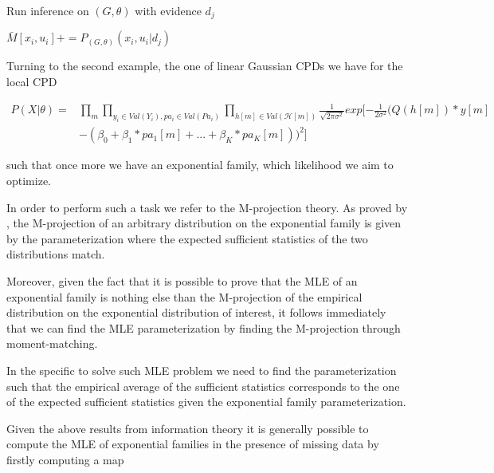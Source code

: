 \documentclass[11pt]{article}
\begin{document}
\begin{article}
\begin{algorithm*}[h!]
\begin{multicols}{2}
\begin{algorithmic}[1]
    \State Run inference on $(G,\theta)$ with evidence $d_{j}$

        \State $\bar{M}[x_{i},u_{i}] \mathrel{{+}{=}} P_{(G,\theta)}(x_{i},u_{i}|d_{j})$
      \EndFor
    \EndFor
\EndFor
\EndFunction
\end{algorithmic}
\end{multicols}
\end{algorithm*}


Turning to the second example, the one of linear Gaussian CPDs we
have for the local CPD

\begin{align} \label{eq:like-gaussian-cpd}
P(X|\theta) = &\prod_m \prod_{y_i \in Val(Y_i), pa_i \in Val(Pa_i)} \prod_{h[m] \in Val(\mathscr{H}[m])} \frac{1}{\sqrt{2\pi\sigma^2}} exp[-\frac{1}{2\sigma^2} (Q(h[m]) * y[m]  \\
	    & - (\beta_0 + \beta_1 * pa_1[m] + ... + \beta_K * pa_K[m]))^2]  \nonumber
\end{align}

such that once more we have an exponential family, which likelihood
we aim to optimize.

In order to perform such a task we refer to the M-projection
theory. As proved by \cite{koller2009probabilistic}, the M-projection
of an arbitrary distribution on the exponential family is given by the
parameterization where the expected sufficient statistics of the
two distributions match.

Moreover, given the fact that it is possible to prove that the MLE
of an exponential family is nothing else than the M-projection of
the empirical distribution on the exponential distribution of
interest, it follows immediately that we can find the MLE
parameterization by finding the M-projection through
moment-matching.

In the specific to solve such MLE problem we need to find the
parameterization such that the empirical average of the sufficient
statistics corresponds to the one of the expected sufficient
statistics given the exponential family parameterization.

Given the above results from information theory it is generally
possible to compute the MLE of exponential families in the presence
of missing data by firstly computing a map


\end{article}
\end{document}
